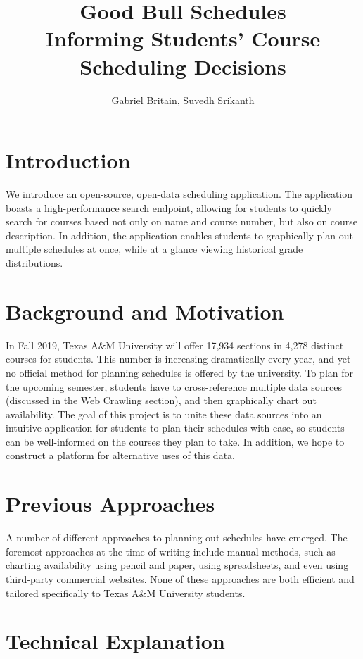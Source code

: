 \documentclass{article}
\title{Good Bull Schedules \\\small{Informing Students' Course Scheduling Decisions}}
\author{Gabriel Britain, Suvedh Srikanth}
\date{}
\begin{document}
\maketitle

\section{Introduction}

We introduce an open-source, open-data scheduling application. The application boasts a high-performance search endpoint, allowing for students to quickly search for courses based not only on name and course number, but also on course description. In addition, the application enables students to graphically plan out multiple schedules at once, while at a glance viewing historical grade distributions.

\section{Background and Motivation}

In Fall 2019, Texas A\&M University will offer 17,934 sections in 4,278 distinct courses for students. This number is increasing dramatically every year, and yet no official method for planning schedules is offered by the university. To plan for the upcoming semester, students have to cross-reference multiple data sources (discussed in the Web Crawling section), and then graphically chart out availability. The goal of this project is to unite these data sources into an intuitive application for students to plan their schedules with ease, so students can be well-informed on the courses they plan to take. In addition, we hope to construct a platform for alternative uses of this data.

\section{Previous Approaches}
A number of different approaches to planning out schedules have emerged. The foremost approaches at the time of writing include manual methods, such as charting availability using pencil and paper, using spreadsheets, and even using third-party commercial websites. None of these approaches are both efficient and tailored specifically to Texas A\&M University students.

\section{Technical Explanation}
\end{document}
